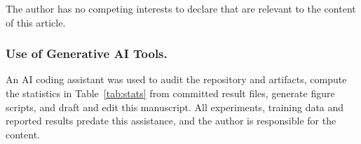 \documentclass[runningheads]{llncs}
\begin{document}
\begin{credits}
\subsubsection{\discintname}
The author has no competing interests to declare that are relevant to the content of this article.

\subsubsection{Use of Generative AI Tools.}
An AI coding assistant was used to audit the repository and artifacts, compute the statistics in Table~\ref{tab:stats} from committed result files, generate figure scripts, and draft and edit this manuscript. All experiments, training data and reported results predate this assistance, and the author is responsible for the content.
\end{credits}
%


%
\end{document}
